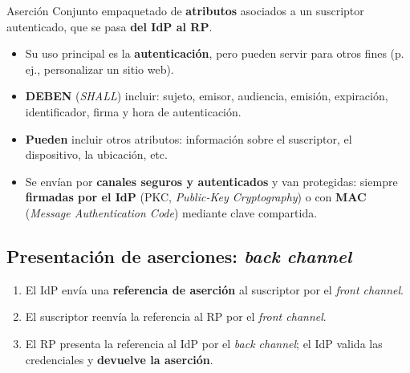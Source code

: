 \documentclass[11pt,a4paper]{report}
\begin{document}
\begin{definicion}{Aserción}
Conjunto empaquetado de \textbf{atributos} asociados a un suscriptor autenticado, que se pasa \textbf{del IdP al RP}.
\end{definicion}
 
\begin{itemize}
  \item Su uso principal es la \textbf{autenticación}, pero pueden servir para otros fines (p.\,ej., personalizar un sitio web).
  \item \textbf{DEBEN} (\emph{SHALL}) incluir: sujeto, emisor, audiencia, emisión, expiración, identificador, firma y hora de autenticación.
  \item \textbf{Pueden} incluir otros atributos: información sobre el suscriptor, el dispositivo, la ubicación, etc.
  \item Se envían por \textbf{canales seguros y autenticados} y van protegidas: siempre \textbf{firmadas por el IdP} (PKC, \emph{Public-Key Cryptography}) o con \textbf{MAC} (\emph{Message Authentication Code}) mediante clave compartida.
\end{itemize}
 
\subsection{Presentación de aserciones: \emph{back channel}}
 
\begin{center}
\end{center}
 
\begin{enumerate}
  \item El IdP envía una \textbf{referencia de aserción} al suscriptor por el \emph{front channel}.
  \item El suscriptor reenvía la referencia al RP por el \emph{front channel}.
  \item El RP presenta la referencia al IdP por el \emph{back channel}; el IdP valida las credenciales y \textbf{devuelve la aserción}.
\end{enumerate}
 
\end{document}
